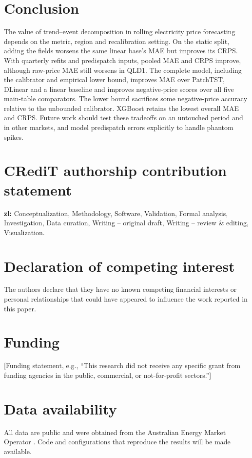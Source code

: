 \documentclass[preprint,12pt]{elsarticle}
\begin{document}
\section{Conclusion}
\label{sec:conclusion}

The value of trend--event decomposition in rolling electricity price forecasting depends on the metric, region and recalibration setting. On the static split, adding the fields worsens the same linear base's MAE but improves its CRPS. With quarterly refits and predispatch inputs, pooled MAE and CRPS improve, although raw-price MAE still worsens in QLD1. The complete model, including the calibrator and empirical lower bound, improves MAE over PatchTST, DLinear and a linear baseline and improves negative-price scores over all five main-table comparators. The lower bound sacrifices some negative-price accuracy relative to the unbounded calibrator. XGBoost retains the lowest overall MAE and CRPS. Future work should test these tradeoffs on an untouched period and in other markets, and model predispatch errors explicitly to handle phantom spikes.

\section*{CRediT authorship contribution statement}
\textbf{zl:} Conceptualization, Methodology, Software, Validation, Formal analysis, Investigation, Data curation, Writing -- original draft, Writing -- review \& editing, Visualization.

\section*{Declaration of competing interest}
The authors declare that they have no known competing financial interests or personal relationships that could have appeared to influence the work reported in this paper.

\section*{Funding}
[Funding statement, e.g., ``This research did not receive any specific grant from funding agencies in the public, commercial, or not-for-profit sectors.'']

\section*{Data availability}
All data are public and were obtained from the Australian Energy Market Operator \citep{aemo2025priceanddemand,aemo2025mmsdm,aemo2025dwgm}. Code and configurations that reproduce the results will be made available.
\end{document}
